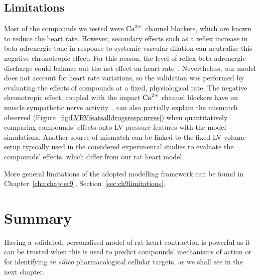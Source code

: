 %
%
%
\subsection{Limitations}\label{sec:ch6limitations}
Most of the compounds we tested were $\textrm{Ca}^{2+}$ channel blockers, which are known to reduce the heart rate. However, secondary effects such as a reflex increase in beta-adrenergic tone in response to systemic vascular dilation can neutralise this negative chronotropic effect. For this reason, the level of reflex beta-adrenergic discharge could balance out the net effect on heart rate~\cite{Low:1982}. Nevertheless, our model does not account for heart rate variations, so the validation was performed by evaluating the effects of compounds at a fixed, physiological rate. The negative chronotropic effect, coupled with the impact $\textrm{Ca}^{2+}$ channel blockers have on muscle sympathetic nerve activity~\cite{Binggeli:2002}, can also partially explain the mismatch observed (Figure~\ref{fig:LVRVfeatsalldrugsrespcurves}) when quantitatively comparing compounds' effects onto LV pressure features with the model simulations. Another source of mismatch can be linked to the fixed LV volume setup typically used in the considered experimental studies to evaluate the compounds' effects, which differ from our rat heart model.

\vspace{0.2cm}
More general limitations of the adopted modelling framework can be found in Chapter~\ref{cha:chapter9}, Section~\ref{sec:ch9limitations}.


%
%
%
\section{Summary}\label{sec:ch6summary}
Having a validated, personalised model of rat heart contraction is powerful as it can be trusted when this is used to predict compounds' mechanisms of action or for identifying \textit{in silico} pharmacological cellular targets, as we shall see in the next chapter.